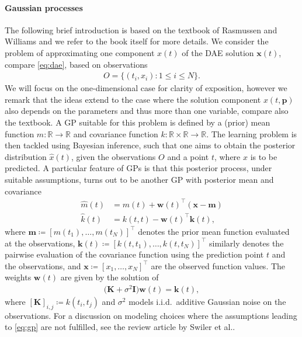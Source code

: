 \documentclass[AMA,STIX1COL]{WileyNJD-v2}
\newcommand{\mb}[1]{\mathbf{#1}}
\newcommand{\T}{{\!\top}}
\begin{document}
\paragraph{Gaussian processes}
The following brief introduction is based on the textbook of Rasmussen and Williams\cite{rasmussen2006} and we refer to the book itself for more details. We consider the problem of approximating one component $x(t)$ of the DAE solution $\mb{x}(t)$, compare \eqref{eq:dae}, based on observations
\begin{align*}
    O = \big\{ (t_i, x_i): 1 \leq i \leq N \big\}.
\end{align*}
We will focus on the one-dimensional case for clarity of exposition, however we remark that the ideas extend to the case where the solution component $x(t, \mb{p})$ also depends on the parameters and thus more than one variable, compare also the textbook\cite{rasmussen2006}. A GP suitable for this problem is defined by a (prior) mean function $m: \mathbb{R} \to \mathbb{R}$ and covariance function $k: \mathbb{R} \times \mathbb{R} \to \mathbb{R}$. The learning problem is then tackled using Bayesian inference, such that one aims to obtain the posterior distribution $\hat{x}(t)$, given the observations $O$ and a point $t$, where $x$ is to be predicted. A particular feature of GPs is that this posterior process, under suitable assumptions, turns out to be another GP with posterior mean and covariance\cite{basak2021}
\begin{subequations}
    \label{eq:gp}
    \begin{align}
        \hat{m}(t) &= m(t) + \mb{w}(t)^\T (\mb{x} - \mb{m}) \label{eq:gpm}\\
        \hat{k}(t) &= k(t, t) - \mb{w}(t)^\T \mb{k}(t) \label{eq:gpv},
    \end{align}
\end{subequations}
where $\mb{m} \coloneqq [m(t_1), \dotsc, m(t_N)]^\T$ denotes the prior mean function evaluated at the observations, $\mb{k}(t) \coloneqq [k(t, t_1), \dotsc, k(t, t_N)]^\T$ similarly denotes the pairwise evaluation of the covariance function using the prediction point $t$ and the observations, and $\mb{x} \coloneqq [x_1, \dotsc, x_N]^\T$ are the observed function values. The weights $\mb{w}(t)$ are given by the solution of
\begin{align*}
    \big( \mb{K} + \sigma^2 \mb{I} \big) \mb{w}(t) = \mb{k}(t),
\end{align*}
where $[\mb{K}]_{i,j} \coloneqq k(t_i, t_j)$ and $\sigma^2$ models i.i.d.~additive Gaussian noise on the observations. For a discussion on modeling choices where the assumptions leading to \eqref{eq:gp} are not fulfilled, see the review article by Swiler et al.\cite{swiler2020}.
\end{document}
